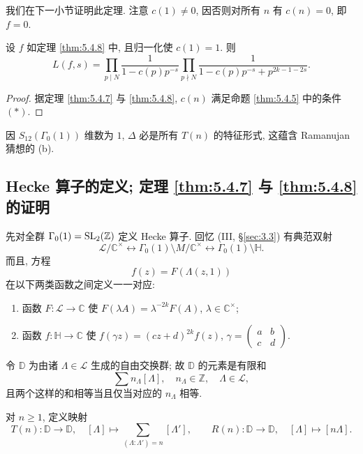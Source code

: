 我们在下一小节证明此定理. 注意 $c(1)\neq 0$, 因否则对所有 $n$ 有 $c(n) = 0$, 即 $f = 0$.

\begin{corollary} \label{thm:5.4.9}
设 $f$ 如定理 \ref{thm:5.4.8} 中, 且归一化使 $c(1) = 1$. 则
\[
L(f, s) = \prod_{p\mid N}\frac{1}{1-c(p)p^{-s}}\prod_{p\nmid N}\frac{1}{1-c(p)p^{-s} + p^{2k-1-2s}}.
\]
\end{corollary}

\begin{proof}
据定理 \ref{thm:5.4.7} 与 \ref{thm:5.4.8}, $c(n)$ 满足命题 \ref{thm:5.4.5} 中的条件 $(*)$.
\end{proof}

\begin{example} \label{thm:5.4.10}
因 $S_{12}(\Gamma_0(1))$ 维数为 $1$, $\Delta$ 必是所有 $T(n)$ 的特征形式, 这蕴含 Ramanujan 猜想的 (b).
\end{example}

\subsection*{Hecke 算子的定义; 定理 \ref{thm:5.4.7} 与 \ref{thm:5.4.8} 的证明}

先对全群 $\Gamma_0(1) = \operatorname{SL}_2(\mathbb{Z})$ 定义 Hecke 算子. 回忆 (III, \S\ref{sec:3.3}) 有典范双射
\[
\mathcal{L}/\mathbb{C}^{\times}\longleftrightarrow\Gamma_0(1)\setminus M/\mathbb{C}^{\times}\longleftrightarrow\Gamma_0(1)\setminus\mathbb{H}.
\]
而且, 方程
\[
f(z) = F(\Lambda(z, 1))
\]
在以下两类函数之间定义一一对应:
\begin{enumerate}[label=\textup{(\alph*)}]
\item 函数 $F\colon\mathcal{L}\to\mathbb{C}$ 使 $F(\lambda A) = \lambda^{-2k}F(A)$, $\lambda\in\mathbb{C}^{\times}$;
\item 函数 $f\colon\mathbb{H}\to\mathbb{C}$ 使 $f(\gamma z) = (cz+d)^{2k}f(z)$, $\gamma = \begin{pmatrix}a & b\\ c & d\end{pmatrix}$.
\end{enumerate}
令 $\mathbb{D}$ 为由诸 $\Lambda\in\mathcal{L}$ 生成的自由交换群; 故 $\mathbb{D}$ 的元素是有限和
\[
\sum n_\Lambda[\Lambda], \quad n_\Lambda\in\mathbb{Z}, \quad\Lambda\in\mathcal{L},
\]
且两个这样的和相等当且仅当对应的 $n_\Lambda$ 相等.

对 $n\ge 1$, 定义映射
\[
T(n)\colon\mathbb{D}\to\mathbb{D}, \quad [\Lambda]\mapsto\sum_{(\Lambda:\Lambda') = n}[\Lambda'],
\qquad
R(n)\colon\mathbb{D}\to\mathbb{D}, \quad [\Lambda]\mapsto[n\Lambda].
\]

